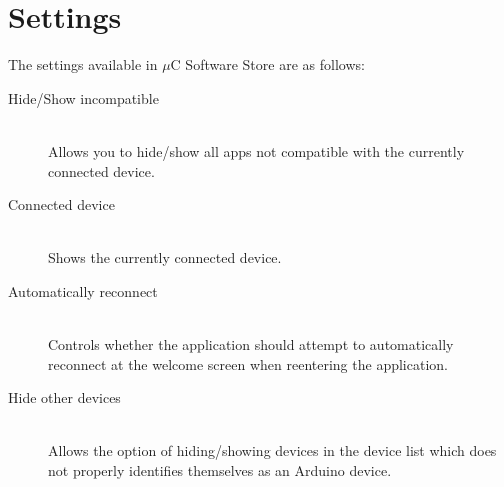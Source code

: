 	\section{Settings}
	The settings available in $\mu$C Software Store are as follows:

	\begin{description}
		\item[Hide/Show incompatible] \hfill \\
			Allows you to hide/show all apps not compatible with the currently connected device.
		\item[Connected device] \hfill \\
			Shows the currently connected device. 
		\item[Automatically reconnect] \hfill \\
			 Controls whether the application should attempt to automatically reconnect at the welcome screen when reentering the application.
		\item[Hide other devices]\hfill \\
		Allows the option of hiding/showing devices in the device list which does not properly identifies themselves as an Arduino device. 
	\end{description}
